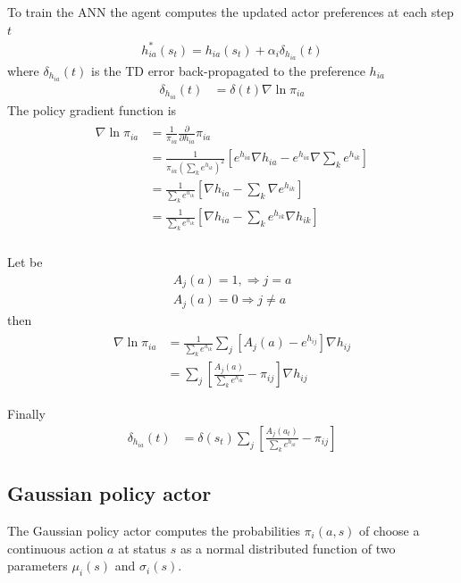 \documentclass[]{article}
\begin{document}
To train the ANN the agent computes the updated actor preferences at each step $ t $
\begin{align}
h^*_{ia}(s_t) = h_{ia}(s_t) + \alpha_i \delta_{h_{ia}}(t) 
\end{align}
where $ \delta_{h_{ia}}(t) $ is the TD error back-propagated to the preference $ h_{ia} $ 
\begin{align*}
\delta_{h_{ia}}(t)&	= \delta(t) \nabla \ln \pi_{ia}
\end{align*}
The policy gradient function is
\begin{align*}
\begin{split}
	\nabla \ln \pi_{ia}& = \frac{1}{\pi_{ia}}
	\frac{\partial}{\partial h_{ia}} \pi_{ia}
	\\
	& = \frac{1}{\pi_{ia} ( \sum_k e^{h_{ik}} )^2}
	\left[
		e^{h_{ia}} \nabla h_{ia} - e^{h_{ia}} \nabla \sum_k e^{h_{ik}}
	\right]
	\\
	& = \frac{1} { \sum_k e^{h_{ik}}}
	\left[
		\nabla h_{ia} - \sum_k \nabla e^{h_{ik}}
	\right]
	\\
	& = \frac{1} { \sum_k e^{h_{ik}}}
	\left[
		\nabla h_{ia} - \sum_k e^{h_{ik}} \nabla h_{ik}
	\right]
	\\
\end{split}
\end{align*}

Let be
\begin{align*}
	A_j(a) = 1, \Rightarrow j = a 
	\\
	A_j(a) = 0 \Rightarrow j \ne a 
\end{align*}
then
\begin{align*}
\begin{split}
	\nabla \ln \pi_{ia}& = \frac{1}{\sum_k e^{h_{ik}}} \sum_j
	\left[
		A_j(a) - e^{h_{ij}} 
	\right] \nabla h_{ij}
	\\
	& = \sum_j
	\left[ \frac{ A_j(a)}{\sum_k e^{h_{ik}}} - \pi_{ij}
	\right] \nabla h_{ij}
\end{split}
\end{align*}

Finally
\begin{align}
\delta_{h_{ia}}(t)&	= \delta(s_t) \sum_j \left[
\frac{A_j(a_t)}{\sum_k e^{h_{ik}}} - \pi_{ij}
\right]
\end{align}

\subsection{Gaussian policy actor}

The Gaussian policy actor computes the probabilities $ \pi_i(a, s) $ of choose a continuous action $ a $ at status $ s $ as a normal distributed function of two parameters $ \mu_i(s) $ and $ \sigma_i(s) $.
\end{document}
